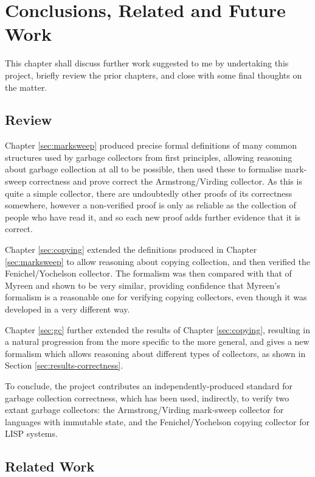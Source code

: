\chapter{Conclusions, Related and Future Work}
\label{sec:conclusion}

This chapter shall discuss further work suggested to me by undertaking
this project, briefly review the prior chapters, and close with some
final thoughts on the matter.

\section{Review}
\label{sec:conclusion-review}

Chapter \ref{sec:marksweep} produced precise formal definitions of
many common structures used by garbage collectors from first
principles, allowing reasoning about garbage collection at all to be
possible, then used these to formalise mark-sweep correctness and
prove correct the Armstrong/Virding collector. As this is quite a
simple collector, there are undoubtedly other proofs of its
correctness somewhere, however a non-verified proof is only as
reliable as the collection of people who have read it, and so each new
proof adds further evidence that it is correct.

Chapter \ref{sec:copying} extended the definitions produced in Chapter
\ref{sec:marksweep} to allow reasoning about copying collection, and
then verified the Fenichel/Yochelson collector. The formalism was then
compared with that of Myreen\cite{Myreen10} and shown to be very
similar, providing confidence that Myreen's formalism is a reasonable
one for verifying copying collectors, even though it was developed in
a very different way.

Chapter \ref{sec:gc} further extended the results of Chapter
\ref{sec:copying}, resulting in a natural progression from the more
specific to the more general, and gives a new formalism which allows
reasoning about different types of collectors, as shown in Section
\ref{sec:results-correctness}.

To conclude, the project contributes an independently-produced
standard for garbage collection correctness, which has been used,
indirectly, to verify two extant garbage collectors: the
Armstrong/Virding mark-sweep collector for languages with immutable
state, and the Fenichel/Yochelson copying collector for LISP systems.

\section{Related Work}
\label{sec:conclusion-related}

